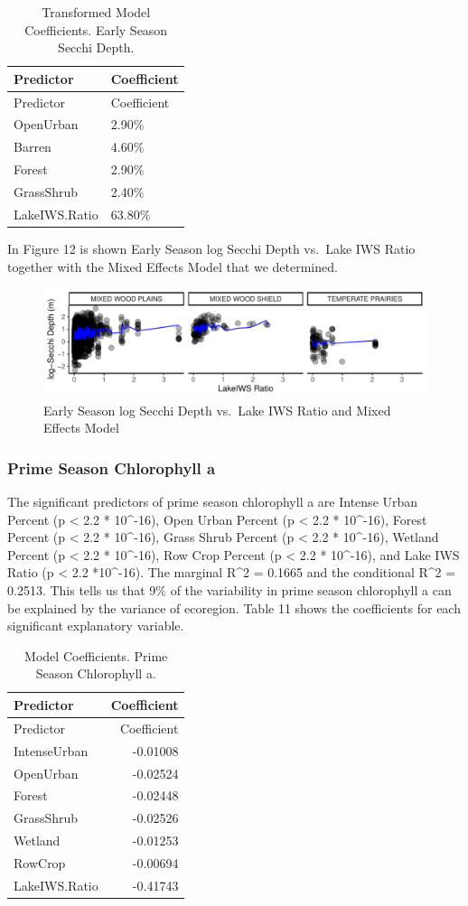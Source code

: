 \documentclass[12pt,]{article}
\begin{document}
\begin{longtable}[]{@{}ll@{}}
\caption{Transformed Model Coefficients. Early Season Secchi
Depth.}\tabularnewline
\toprule
Predictor & Coefficient\tabularnewline
\midrule
\endfirsthead
\toprule
Predictor & Coefficient\tabularnewline
\midrule
\endhead
OpenUrban & 2.90\%\tabularnewline
Barren & 4.60\%\tabularnewline
Forest & 2.90\%\tabularnewline
GrassShrub & 2.40\%\tabularnewline
LakeIWS.Ratio & 63.80\%\tabularnewline
\bottomrule
\end{longtable}

In Figure 12 is shown Early Season log Secchi Depth vs.~Lake IWS Ratio
together with the Mixed Effects Model that we determined.

\begin{figure}
\centering
\includegraphics{Bollt_Greif_Raby_Roth_Project_Final_files/figure-latex/unnamed-chunk-23-1.pdf}
\caption{Early Season log Secchi Depth vs.~Lake IWS Ratio and Mixed
Effects Model}
\end{figure}

\hypertarget{prime-season-chlorophyll-a}{%
\subsubsection{Prime Season Chlorophyll
a}\label{prime-season-chlorophyll-a}}

The significant predictors of prime season chlorophyll a are Intense
Urban Percent (p \textless{} 2.2 * 10\^{}-16), Open Urban Percent (p
\textless{} 2.2 * 10\^{}-16), Forest Percent (p \textless{} 2.2 *
10\^{}-16), Grass Shrub Percent (p \textless{} 2.2 * 10\^{}-16), Wetland
Percent (p \textless{} 2.2 * 10\^{}-16), Row Crop Percent (p \textless{}
2.2 * 10\^{}-16), and Lake IWS Ratio (p \textless{} 2.2 *10\^{}-16). The
marginal R\^{}2 = 0.1665 and the conditional R\^{}2 = 0.2513. This tells
us that 9\% of the variability in prime season chlorophyll a can be
explained by the variance of ecoregion. Table 11 shows the coefficients
for each significant explanatory variable.

\begin{longtable}[]{@{}lr@{}}
\caption{Model Coefficients. Prime Season Chlorophyll a.}\tabularnewline
\toprule
Predictor & Coefficient\tabularnewline
\midrule
\endfirsthead
\toprule
Predictor & Coefficient\tabularnewline
\midrule
\endhead
IntenseUrban & -0.01008\tabularnewline
OpenUrban & -0.02524\tabularnewline
Forest & -0.02448\tabularnewline
GrassShrub & -0.02526\tabularnewline
Wetland & -0.01253\tabularnewline
RowCrop & -0.00694\tabularnewline
LakeIWS.Ratio & -0.41743\tabularnewline
\bottomrule
\end{longtable}
\end{document}
